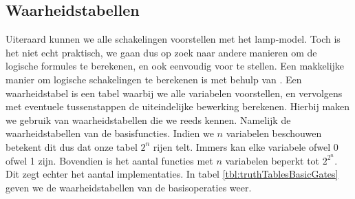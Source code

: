 \subsection{Waarheidstabellen}
Uiteraard kunnen we alle schakelingen voorstellen met het lamp-model. Toch is het niet echt praktisch, we gaan dus op zoek naar andere manieren om de logische formules te berekenen, en ook eenvoudig voor te stellen. Een makkelijke manier om logische schakelingen te berekenen is met behulp van . Een waarheidstabel is een tabel waarbij we alle variabelen voorstellen, en vervolgens met eventuele tussenstappen de uiteindelijke bewerking berekenen. Hierbij maken we gebruik van waarheidstabellen die we reeds kennen. Namelijk de waarheidstabellen van de basisfuncties. Indien we $n$ variabelen beschouwen betekent dit dus dat onze tabel $2^n$ rijen telt. Immers kan elke variabele ofwel 0 ofwel 1 zijn. Bovendien is het aantal functies met $n$ variabelen beperkt tot $2^{2^n}$. Dit zegt echter het aantal implementaties. In tabel \ref{tbl:truthTablesBasicGates} geven we de waarheidstabellen van de basisoperaties weer.
\begin{table}[htb]
\centering
{}
\caption{Waarheidstabellen van de basisoperaties.}
\label{tbl:truthTablesBasicGates}
\end{table}
